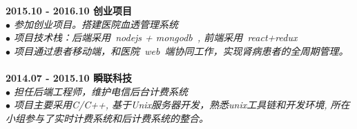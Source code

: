 \documentclass[a3paper,12pt,final]{memoir}
\newcommand{\myThemeColor}{RoyalBlue}
\newcommand{\SmallSep}{\vspace{0.9em}}
\newcommand{\CVSection}[1]
	{\Large\textbf{#1}\par
	\vspace{0.2cm}\normalsize\normalfont}
\newcommand{\CVItem}[1]
	{\textbf{\color{\myThemeColor} #1}}
\begin{document}
\begin{CJK*}{UTF8}{gbsn}
\CVItem{2015.10 - 2016.10 \hfill 创业项目}\\
\textit{$\bullet$ 参加创业项目。搭建医院血透管理系统} \\
\textit{$\bullet$ 项目技术栈：后端采用~nodejs + mongodb~, 前端采用~react+redux~} \\
\textit{$\bullet$ 项目通过患者移动端，和医院~web~端协同工作，实现肾病患者的全周期管理。}\\
\\
\CVItem{2014.07 - 2015.10 \hfill 瞬联科技}\\
\textit{$\bullet$ 担任后端工程师，维护电信后台计费系统} \\
\textit{$\bullet$ 项目主要采用C/C++, 基于Unix服务器开发，熟悉unix工具链和开发环境, 所在小组参与了实时计费系统和后计费系统的整合。} \\



\end{CJK*}
\end{document}

